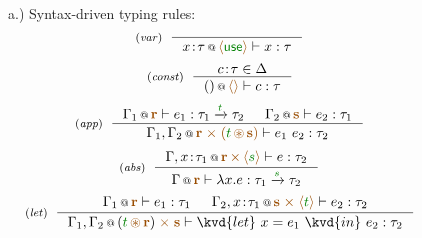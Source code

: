 \begin{figure}[t]
{\small a.) Syntax-driven typing rules:}
\begin{equation*}
\tyrule{var}
  { }
  {\coctx{x\!:\!\tau}{\alift{\cunit}} \vdash x : \tau }
\end{equation*}
\begin{equation*}
\tyrule{const}
  {c \!:\! \tau \in \Delta}
  {\coctx{()}{\alift{}} \vdash c : \tau }
\end{equation*}
\begin{equation*}
\tyrule{app}
  {\coctx{\Gamma_1}{\aclrd{\textbf{r}}} \vdash e_1 : \tau_1 \xrightarrow{\cclrd{t}} \tau_2 &
   \coctx{\Gamma_2}{\aclrd{\textbf{s}}} \vdash e_2 : \tau_1 }
  {\coctx{\Gamma_1, \Gamma_2}{\aclrd{\textbf{r}\;\atimes\;(\cclrd{t} \,\aseq\, \aclrd{\textbf{s}})}} \vdash e_1~e_2 : \tau_2}
\end{equation*}
\begin{equation*}
\tyrule{abs}
  {\coctx{\Gamma, x\!:\!\tau_1}{\aclrd{\textbf{r}}\,\atimes\,\alift{\cclrd{s}}} \vdash e : \tau_2}
  {\coctx{\Gamma}{\aclrd{\textbf{r}}} \vdash \lambda x.e : \tau_1 \xrightarrow{\cclrd{s}} \tau_2 }
\end{equation*}
\begin{equation*}
\tyrule{let}
  { \coctx{\Gamma_1}{\aclrd{\textbf{r}}} \vdash e_1 : \tau_1 &
    \coctx{\Gamma_2, x\!:\!\tau_1}{\aclrd{\textbf{s}}\;\atimes\;\alift{\cclrd{t}}} \vdash e_2 : \tau_2}
  {\coctx{\Gamma_1, \Gamma_2}{(\cclrd{t} \,\aseq\, \aclrd{\textbf{r}}) \;\atimes\; \aclrd{\textbf{s}}} \vdash \kvd{let}~x=e_1~\kvd{in}~e_2 : \tau_2 }
\end{equation*}


\end{figure}
